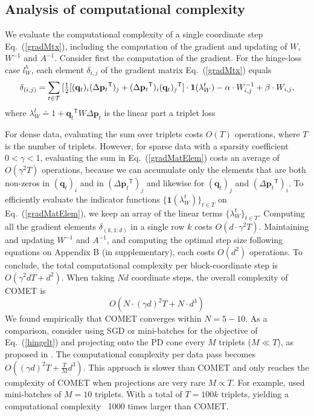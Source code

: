 \documentclass{article} %
\newcommand\mat[1]{{#1}}
\renewcommand\vec[1]{\mathbf{#1}}
\newcommand{\T}{{}^\mathsf{T}}
\newcommand{\W}{\mat{W}}
\newcommand{\eqdef}{\doteq}
\newcommand{\q}{{\vec{q}}}
\newcommand{\p}{{\vec{p}}}
\newcommand{\trip}{{t}}
\newcommand{\qt}{{\q_{\trip}}}
\newcommand{\invA}{A^{-1}}
\renewcommand{\eqref}[1]{Eq.~(\ref{#1})}
\begin{document}
\subsection{Analysis of computational complexity}
We evaluate the computational complexity of a single coordinate step \eqref{gradMtx}, including the computation of the gradient and updating of $\W$, $\W^{-1}$ and $\invA$. Consider first the computation of the gradient. For the hinge-loss case $l^{h}_W$, each element $\delta_{i,j}$ of the gradient matrix \eqref{gradMtx} equals
\begin{equation}
    \delta_{(i,j)} = \sum\limits_{t\in \cal{T}}{ [\tfrac{1}{2}[(\vec{q}_{t})_i(\Delta\vec{p}_{t}\T)_j + (\Delta\vec{p}_{t}\T)_i(\vec{q}_{t})_j\T] } \cdot \textbf{1}(\lambda_{W}^t) - \alpha \cdot \W^{-1}_{i,j} + \beta \cdot \W_{i,j},
\label{gradMatElem}
\end{equation}
where $\lambda_{W}^t \eqdef 1+\qt\T \W \Delta\p_{t}$ is the linear part a triplet loss

For dense data, evaluating the sum over triplets costs $O(T)$ operations, where $T$ is the number of triplets. However, for sparse data with a sparsity coefficient $ 0< \gamma <1 $, evaluating the sum in \eqref{gradMatElem} costs an average of $O(\gamma^2 T)$ operations, because we can accumulate only the elements that are both non-zeros in $(\vec{q}_{t})_i$ and in $(\Delta\vec{p}_{t}\T)_j  $ and likewise for $(\vec{q}_{t})_j$ and $(\Delta\vec{p}_{t}\T)_i$.   To efficiently evaluate the indicator functions $\{ \textbf{1}(\lambda_{W}^t) \}_{t \in T}$ on \eqref{gradMatElem}, we keep an array of the linear terms $\{\lambda_{W}^t\}_{t \in T}$. Computing all the gradient elements $\delta_{(k,1:d)}$ in a single row $k$ costs $O(d\cdot \gamma^2 T)$.
Maintaining and updating $\W^{-1}$ and $\invA$, and computing the optimal step size following equations on Appendix B (in supplementary), each costs $O(d^2)$ operations. 
To conclude, the total computational complexity per block-coordinate step is $O(\gamma^2 d T + d^2)$. When taking $Nd$ coordinate steps, the overall complexity of COMET is 
\begin{equation}
O(N \cdot (\gamma d)^2 T + N \cdot d^3)
\label{cometComplexity}
\end{equation}
We found empirically that COMET converges within $N= 5 - 10$. As a comparison, consider using SGD or mini-batches for the objective of \eqref{hingelt} and projecting onto the PD cone every $M$ triplets ($M \ll T$), as proposed in \cite{OASIS,qian}. The computational complexity per data pass becomes $O((\gamma d)^2 T + \frac{T}{M} d^3)$. This approach is slower than COMET and only reaches the complexity of COMET when projections are very rare $M \propto T$. For example, \citet{qian} used mini-batches of $M=10$ triplets. With a total of $T=100k$ triplets, yielding a computational complexity ~1000 times larger than COMET.
\end{document}
